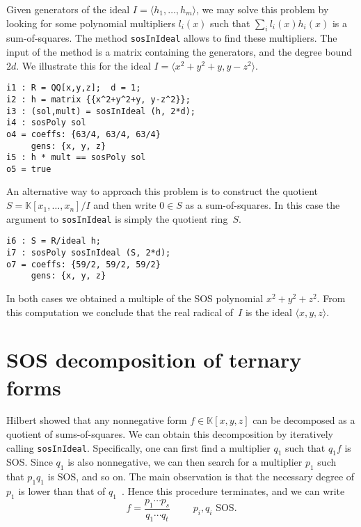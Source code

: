 \documentclass[11pt]{amsart}
\theoremstyle{plain}%
\theoremstyle{definition}
\theoremstyle{remark}
\newcommand{\kk}{\mathbb{K}}
\begin{document}
Given generators of the ideal $I=\langle h_1,\dots,h_m\rangle$, we may solve this problem by looking for some polynomial multipliers $l_i(x)$ such that  $\sum_i l_i(x) h_i(x)$ is a sum-of-squares.
The method \verb|sosInIdeal| allows to find these multipliers.
The input of the method is a matrix containing the generators, and the degree bound~$2d$.
We illustrate this for the ideal $I=\langle x^2{+}y^2{+}y, y{-}z^2 \rangle$.
{\small
\begin{verbatim}
i1 : R = QQ[x,y,z];  d = 1;
i2 : h = matrix {{x^2+y^2+y, y-z^2}};
i3 : (sol,mult) = sosInIdeal (h, 2*d);
i4 : sosPoly sol
o4 = coeffs: {63/4, 63/4, 63/4}
     gens: {x, y, z}
i5 : h * mult == sosPoly sol
o5 = true
\end{verbatim}
}
\noindent
An alternative way to approach this problem is to construct the quotient $S = \kk[x_{1},\dots,x_{n}]/I$ and then write $0\in S$ as a sum-of-squares.
In this case the argument to \verb|sosInIdeal| is simply the quotient ring~$S$.
{\small
\begin{verbatim}
i6 : S = R/ideal h;
i7 : sosPoly sosInIdeal (S, 2*d);
o7 = coeffs: {59/2, 59/2, 59/2}
     gens: {x, y, z}
\end{verbatim}
}
\noindent
In both cases we obtained a multiple of the SOS polynomial $x^2{+}y^2{+}z^2$.
From this computation we conclude that the real radical of~$I$ is the ideal $\langle x,y,z\rangle$.

\section{SOS decomposition of ternary forms}

Hilbert showed that any nonnegative form $f\in \kk[x,y,z]$ can be decomposed as a quotient of sums-of-squares.
We can obtain this decomposition by iteratively calling \verb|sosInIdeal|.
Specifically, one can first find a multiplier $q_{1}$ such that $q_{1}f$ is SOS.
Since $q_1$ is also nonnegative, we can then search for a multiplier $p_{1}$ such that $p_{1}q_{1}$ is SOS, and so on.
The main observation is that the necessary degree of $p_{1}$ is lower than that of $q_{1}$~\cite{de2004products}.
Hence this procedure terminates, and we can write
\[
  f = \frac{p_{1}\cdots p_{s}}{q_{1}\cdots q_{t}} \qquad \text {
    $p_{i},q_{i}$ SOS}.
\]
\end{document}
